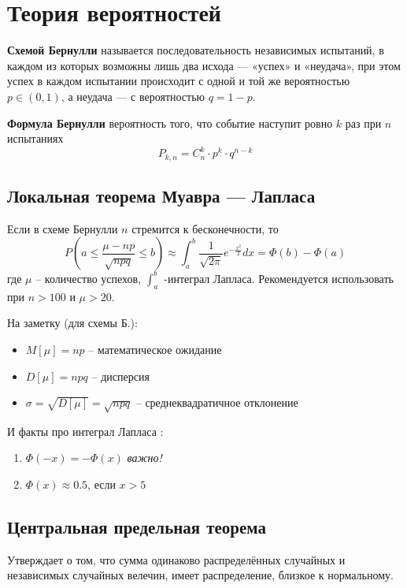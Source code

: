\section{Теория вероятностей}

\textbf{Схемой Бернулли}  называется последовательность независимых испытаний, в каждом из которых возможны лишь два исхода — «успех» и «неудача», при этом успех в каждом испытании происходит с одной и той же вероятностью  $p \in (0, 1)$, а неудача — с вероятностью $q = 1 - p$.

\textbf{Формула Бернулли} вероятность того, что событие наступит ровно $k$ раз при $n$ испытаниях
\begin{equation}
	P_{k,n}=C_n^k\cdot p^k \cdot q^{n-k}
\end{equation}

\subsection{Локальная теорема Муавра — Лапласа}

Если в схеме Бернулли $n$ стремится к бесконечности, то  
\begin{equation}
	P(a \leq\frac{\mu - np}{\sqrt{npq}} \leq b) 	\approx \int_{a}^{b} \frac{1}{\sqrt{2\pi}} e^{-\frac{x^2}{2}} dx = \Phi(b) - \Phi(a)
\end{equation}
где $\mu$ -- количество успехов, $\int_a^b$ -интеграл Лапласа. Рекомендуется использовать при $n > 100$ и $\mu > 20$. 

На заметку (для схемы Б.):
\begin{itemize}
	\item $M[\mu] = np$ -- математическое ожидание
	\item $D[\mu] = npq$ -- дисперсия
	\item $ \sigma = \sqrt{D[\mu]} = \sqrt{npq}$ -- среднеквадратичное отклонение
\end{itemize}
\vspace{1em}
И факты про интеграл Лапласа :
\begin{enumerate}
	\item $\Phi(-x) = - \Phi(x)$ \textit{важно!}
	\item $\Phi(x)\approx  0.5$, если $x > 5$
\end{enumerate}

\subsection{Центральная предельная теорема}
Утверждает о том, что сумма одинаково распределённых случайных и независимых случайных велечин, имеет распределение, близкое к нормальному.

